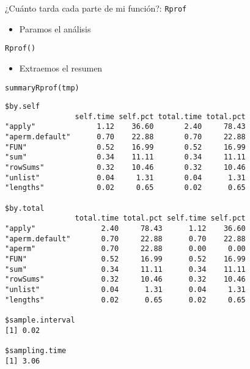 \documentclass[xcolor={usenames,svgnames,dvipsnames}]{beamer}
\begin{document}
\begin{frame}[label={sec:org4571afc},fragile]{¿Cuánto tarda cada parte de mi función?: \texttt{Rprof}}
 \begin{itemize}
\item Paramos el análisis
\end{itemize}
\lstset{language=r,label= ,caption= ,captionpos=b,numbers=none}
\begin{lstlisting}
Rprof()
\end{lstlisting}

\begin{itemize}
\item Extraemos el resumen
\end{itemize}
\lstset{language=r,label= ,caption= ,captionpos=b,numbers=none}
\begin{lstlisting}
summaryRprof(tmp)
\end{lstlisting}

\begin{verbatim}
$by.self
                self.time self.pct total.time total.pct
"apply"              1.12    36.60       2.40     78.43
"aperm.default"      0.70    22.88       0.70     22.88
"FUN"                0.52    16.99       0.52     16.99
"sum"                0.34    11.11       0.34     11.11
"rowSums"            0.32    10.46       0.32     10.46
"unlist"             0.04     1.31       0.04      1.31
"lengths"            0.02     0.65       0.02      0.65

$by.total
                total.time total.pct self.time self.pct
"apply"               2.40     78.43      1.12    36.60
"aperm.default"       0.70     22.88      0.70    22.88
"aperm"               0.70     22.88      0.00     0.00
"FUN"                 0.52     16.99      0.52    16.99
"sum"                 0.34     11.11      0.34    11.11
"rowSums"             0.32     10.46      0.32    10.46
"unlist"              0.04      1.31      0.04     1.31
"lengths"             0.02      0.65      0.02     0.65

$sample.interval
[1] 0.02

$sampling.time
[1] 3.06
\end{verbatim}
\end{frame}
\end{document}

